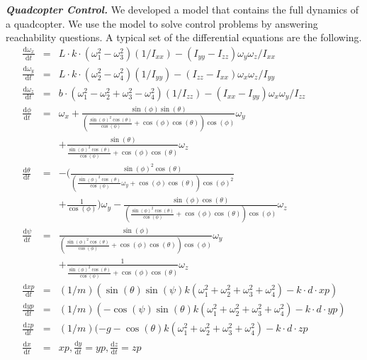 \textbf{\textit{Quadcopter Control.}} We developed a model that contains the full dynamics of a quadcopter. We use the model to solve control problems by answering reachability questions. A typical set of the differential equations are the following.
\begin{eqnarray*}
\frac{\mathrm{d}\omega_x}{\mathrm{d}t} &=& L\cdot k\cdot (\omega_1^2 - \omega_3^2)(1/I_{xx})-(I_{yy} - I_{zz})\omega_y\omega_z/I_{xx}\\
\frac{\mathrm{d}\omega_y}{\mathrm{d}t} &=& L\cdot k\cdot(\omega_2^2 - \omega_4^2)(1/I_{yy})-(I_{zz} - I_{xx})\omega_x\omega_z/I_{yy}\\
\frac{\mathrm{d}\omega_z}{\mathrm{d}t} &=& b\cdot(\omega_1^2 - \omega_2^2 + \omega_3^2 - \omega_4^2)(1/I_{zz})-(I_{xx} - I_{yy})\omega_x\omega_y/I_{zz}\\
\frac{\mathrm{d}\phi}{\mathrm{d}t} &=& \omega_x + \displaystyle{\frac{\sin\left(\phi\right) \sin\left(\theta\right)}{{\left(\frac{\sin\left(\phi\right)^{2} \cos\left(\theta\right)}{\cos\left(\phi\right)} + \cos\left(\phi\right) \cos\left(\theta\right)\right)} \cos\left(\phi\right)}}\omega_y\\
& &+\displaystyle\frac{\sin\left(\theta\right)}{\frac{\sin\left(\phi\right)^{2} \cos\left(\theta\right)}{\cos\left(\phi\right)} + \cos\left(\phi\right) \cos\left(\theta\right)}\omega_z\\
\frac{\mathrm{d}\theta}{\mathrm{d}t} &=& -(\displaystyle\frac{\sin\left(\phi\right)^{2} \cos\left(\theta\right)}{{\left(\frac{\sin\left(\phi\right)^{2} \cos\left(\theta\right)}{\cos\left(\phi\right)}\omega_y + \cos\left(\phi\right) \cos\left(\theta\right)\right)} \cos\left(\phi\right)^{2}}\\
& &+ \frac{1}{\cos\left(\phi\right)})\omega_y -\displaystyle\frac{\sin\left(\phi\right) \cos\left(\theta\right)}{{\left(\frac{\sin\left(\phi\right)^{2} \cos\left(\theta\right)}{\cos\left(\phi\right)} + \cos\left(\phi\right) \cos\left(\theta\right)\right)} \cos\left(\phi\right)}\omega_z \\
\frac{\mathrm{d}\psi}{\mathrm{d}t} &=& \displaystyle\frac{\sin\left(\phi\right)}{{\left(\frac{\sin\left(\phi\right)^{2} \cos\left(\theta\right)}{\cos\left(\phi\right)} + \cos\left(\phi\right) \cos\left(\theta\right)\right)} \cos\left(\phi\right)}\omega_y\\
& &+ \displaystyle\frac{1}{\frac{\sin\left(\phi\right)^{2} \cos\left(\theta\right)}{\cos\left(\phi\right)} + \cos\left(\phi\right) \cos\left(\theta\right)}\omega_z\\
\frac{\mathrm{d}{xp}}{\mathrm{d}t} &=& (1/m)(\sin(\theta)\sin(\psi)k(\omega_1^2 + \omega_2^2 +\omega_3^2+\omega_4^2) - k\cdot d\cdot{xp})\\
\frac{\mathrm{d}{yp}}{\mathrm{d}t} &=& (1/m)(-\cos(\psi)\sin(\theta)k(\omega_1^2 + \omega_2^2 +\omega_3^2+\omega_4^2) - k\cdot d\cdot{yp})\\
\frac{\mathrm{d}{zp}}{\mathrm{d}t} &=& (1/m)(-g-\cos(\theta)k(\omega_1^2 + \omega_2^2 +\omega_3^2+\omega_4^2) - k\cdot d\cdot{zp}\\
\frac{\mathrm{d}x}{\mathrm{d}t} &=& {xp}, \frac{\mathrm{d}y}{\mathrm{d}t} = {yp}, \frac{\mathrm{d}z}{\mathrm{d}t} = {zp}
\end{eqnarray*}


